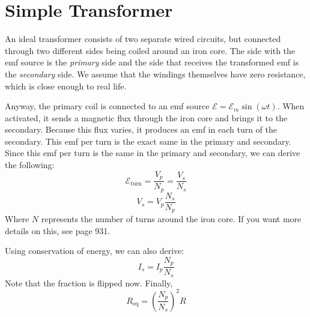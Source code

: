 \documentclass[]{article}
\begin{document}
\section{Simple Transformer}
An ideal transformer consists of two separate wired circuits, but connected through two different sides being coiled around an iron core. The side with the emf source is the \emph{primary} side and the side that receives the transformed emf is the \emph{secondary} side. We assume that the windings themselves have zero resistance, which is close enough to real life.

Anyway, the primary coil is connected to an emf source $ \mathcal{E} = \mathcal{E}_m \sin\left(\omega t\right) $. When activated, it sends a magnetic flux through the iron core and brings it to the secondary. Because this flux varies, it produces an emf in each turn of the secondary. This emf per turn is the exact same in the primary and secondary. Since this emf per turn is the same in the primary and secondary, we can derive the following:
\[ \mathcal{E}_{\mathrm{turn}} = \frac{V_p}{N_p} = \frac{V_s}{N_s} \]
\[ V_s = V_p \frac{N_s}{N_p} \]
Where $ N $ represents the number of turns around the iron core. If you want more details on this, see page 931.

Using conservation of energy, we can also derive:
\[ I_s = I_p \frac{N_p}{N_s} \]
Note that the fraction is flipped now. Finally,
\[ R_{\mathrm{eq}} = \left(\frac{N_p}{N_s}\right)^2 \! R \]
\end{document}
